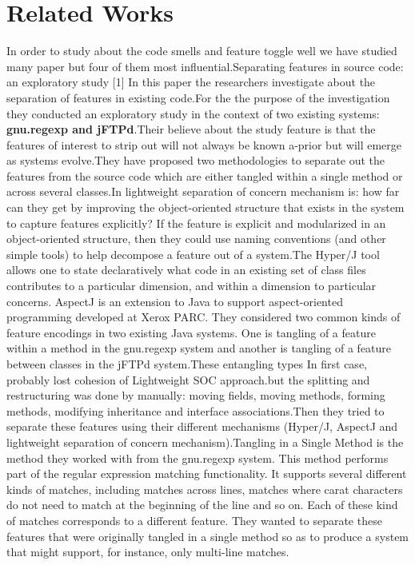 \documentclass[conference]{IEEEtran}
\begin{document}
\section{Related Works}
\label{related-works}
In order to study about the code smells and feature toggle well we have studied many paper but four of them most influential.Separating features in source code: an exploratory study [1] In this paper the researchers investigate about the separation of features in existing code.For the the purpose of the investigation they conducted an exploratory study in the context of two existing systems: \textbf{gnu.regexp and jFTPd}.Their believe about the study feature is that the features of interest to strip out will not always be known a-prior but will emerge as systems evolve.They have proposed two methodologies to separate out the features from the source code which are either tangled within a single method or across several classes.In lightweight separation of concern mechanism is: how far can they get by improving the object-oriented structure that exists in the system to capture features explicitly? If the feature is explicit and modularized in an object-oriented structure, then they could use naming conventions (and other simple tools) to help decompose a feature out of a system.The Hyper/J tool allows one to state declaratively what code in an existing set of class files contributes to a particular dimension, and within a dimension to particular concerns.
AspectJ is an extension to Java to support aspect-oriented programming developed at Xerox PARC.
They considered two common kinds of feature encodings in two existing Java systems. One is tangling of a feature within a method in the gnu.regexp system and another is tangling of a feature between classes in the jFTPd system.These entangling types In first case, probably lost cohesion of Lightweight SOC approach.but the splitting and restructuring was done by manually: moving fields, moving methods, forming methods, modifying inheritance and interface associations.Then they tried to separate these features using their different mechanisms (Hyper/J, AspectJ and lightweight separation of concern mechanism).Tangling in a Single Method is the method they worked with from the gnu.regexp system. This method performs part of the regular expression matching functionality. It supports several different kinds of matches, including matches across lines, matches where carat characters do not need to match at the beginning of the line and so on. Each of these kind of matches corresponds to a different feature. They wanted to separate these features that were originally tangled in a single method so as to produce a system that might support, for instance, only multi-line matches.
\end{document}
